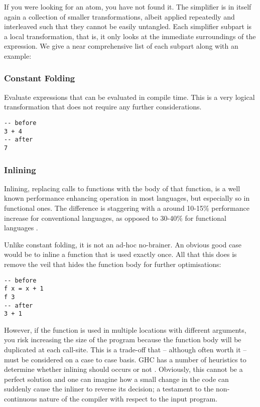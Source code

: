If you were looking for an atom, you have not found it. The simplifier is in itself again a collection of smaller transformations,
albeit applied repeatedly and interleaved such that they cannot be easily untangled. Each simplifier subpart is a local transformation,
that is, it only looks at the immediate surroundings of the expression. We give a near comprehensive list of each subpart along with an example: 
\cite{ghc_wiki_core2core}

\subsubsection{Constant Folding}
Evaluate expressions that can be evaluated in compile time. This is a very logical transformation that does not
require any further considerations.

\begin{listing}[H]
\begin{verbatim}
-- before
3 + 4
-- after
7
\end{verbatim}
\end{listing}

\subsubsection{Inlining}
\label{section:background:inlining}

Inlining, replacing calls to functions with the body of that function, is a well known performance enhancing operation in most languages,
but especially so in functional ones.
The difference is staggering with a around 10-15\% performance increase for conventional languages, as opposed to
30-40\% for functional languages \cite{haskell_optimisations_1997}.

Unlike constant folding, it is not an ad-hoc no-brainer. An obvious good case would be to inline a function that is
used exactly once. All that this does is remove the veil that hides the function body for further optimisations:

\begin{listing}[H]
\begin{verbatim}
-- before
f x = x + 1
f 3
-- after
3 + 1
\end{verbatim}
\end{listing}

However, if the function is used in multiple locations with different arguments, you risk increasing the size of the program
because the function body will be duplicated at each call-site. This is a trade-off that -- although often worth it -- must be
considered on a case to case basis. GHC has a number of heuristics to determine whether inlining should occurs or not \cite{secrets_of_the_inliner}.
Obviously, this cannot be a perfect solution and one can imagine how a small change in the code can suddenly cause the inliner to reverse
its decision; a testament to the non-continuous nature of the compiler with respect to the input program.

